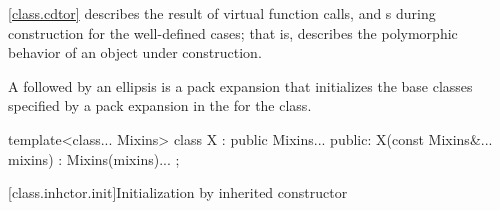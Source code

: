 \pnum
\begin{note}
\ref{class.cdtor} describes the result of virtual function calls,
and
s
during construction for the well-defined cases;
that is, describes the polymorphic behavior
of an object under construction.
\end{note}

\pnum
{}%
A  followed by an ellipsis is
a pack expansion that initializes the base
classes specified by a pack expansion in the 
for the class.
\begin{example}
\begin{codeblock}
template<class... Mixins>
class X : public Mixins... {
public:
  X(const Mixins&... mixins) : Mixins(mixins)... { }
};
\end{codeblock}

\end{example}

[class.inhctor.init]{Initialization by inherited constructor}%

